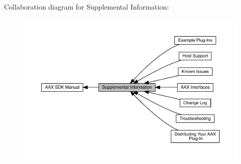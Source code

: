 Collaboration diagram for Supplemental Information\+:
\nopagebreak
\begin{figure}[H]
\begin{center}
\leavevmode
\includegraphics[width=350pt]{a00841}
\end{center}
\end{figure}
